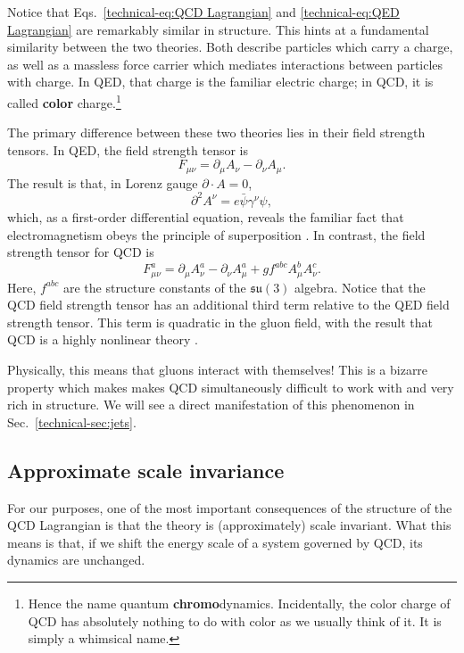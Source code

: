 \documentclass[../thesis.tex]{subfiles}
\providecommand{\su}{\mathfrak{su}}
\begin{document}
	Notice that Eqs.~\ref{technical-eq:QCD Lagrangian} and \ref{technical-eq:QED Lagrangian} are remarkably similar in structure. This hints at a fundamental similarity between the two theories. Both describe particles which carry a charge, as well as a massless force carrier which mediates interactions between particles with charge. In QED, that charge is the familiar electric charge; in QCD, it is called \textbf{color} charge.\footnote{Hence the name quantum \textbf{chromo}dynamics. Incidentally, the color charge of QCD has absolutely nothing to do with color as we usually think of it. It is simply a whimsical name.}

	The primary difference between these two theories lies in their field strength tensors. In QED, the field strength tensor is \cite{larkoski_elementary_2019-1}
	\begin{equation}
		F_{\mu \nu} = \partial_\mu A_\nu - \partial_\nu A_\mu.
	\end{equation}
	The result is that, in Lorenz gauge $\partial \cdot A = 0$,
	\begin{equation}
		\partial^2 A^\nu = e\bar \psi \gamma^\nu \psi,
	\end{equation}
	which, as a first-order differential equation, reveals the familiar fact that electromagnetism obeys the principle of superposition \cite{larkoski_elementary_2019-1}. In contrast, the field strength tensor for QCD is \cite{larkoski_elementary_2019-1}
	\begin{equation}\label{technical-eq:QCD field strength}
		F_{\mu \nu}^a = \partial_\mu A_\nu^a - \partial_\nu A_\mu^a + g f^{abc} A_\mu^b A_\nu^c.
	\end{equation}
	Here, $f^{abc}$ are the structure constants of the $\su(3)$ algebra. Notice that the QCD field strength tensor has an additional third term relative to the QED field strength tensor. This term is quadratic in the gluon field, with the result that QCD is a highly nonlinear theory \cite{larkoski_elementary_2019-1}. 

	Physically, this means that gluons interact with themselves! This is a bizarre property which makes makes QCD simultaneously difficult to work with and very rich in structure. We will see a direct manifestation of this phenomenon in Sec.~\ref{technical-sec:jets}.

\subsection{Approximate scale invariance}
	For our purposes, one of the most important consequences of the structure of the QCD Lagrangian is that the theory is (approximately) scale invariant. What this means is that, if we shift the energy scale of a system governed by QCD, its dynamics are unchanged. 
\end{document}
